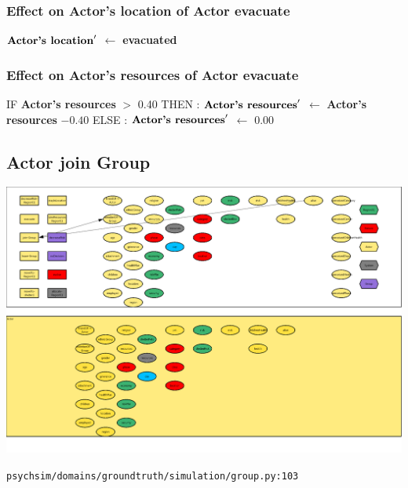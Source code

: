 \documentclass{article}%
\begin{document}
%
\subsubsection{Effect on Actor's location of Actor evacuate}%
\label{ssubsec:Effect on Actor's location of Actor evacuate}%
\begin{flushleft}%
$\mbox{\textbf{Actor's location}} '$%
$\leftarrow$%
\textbf{evacuated}%
\end{flushleft}

%
\subsubsection{Effect on Actor's resources of Actor evacuate}%
\label{ssubsec:Effect on Actor's resources of Actor evacuate}%
\begin{flushleft}%
IF %
\textbf{Actor's resources}%
$>$%
0.40%
\linebreak%
\hspace*{2em}%
THEN %
: %
$\mbox{\textbf{Actor's resources}} '$%
$\leftarrow$%
\textbf{Actor's resources}%
${-}0.40$%
\linebreak%
\hspace*{2em}%
ELSE %
: %
$\mbox{\textbf{Actor's resources}} '$%
$\leftarrow$%
0.00%
\end{flushleft}

%
\subsection{Actor join Group}%
\label{subsec:Actor join Group}%
\includegraphics[width=\textwidth]{images/Actor-join-Group.png}%
\begin{flushleft}%
\verb|psychsim/domains/groundtruth/simulation/group.py:103|%
\end{flushleft}%
\end{document}
